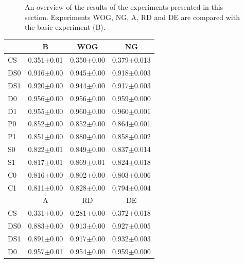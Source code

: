 \begin{figure}
\caption{An overview of the results of the experiments presented in this section. Experiments WOG, NG, A, RD and DE are compared with the basic experiment (B).}
\label{f:par:int}
\end{figure}

\begin{table}
\centering
\begin{tabular}{lccc}
\lsptoprule
         &B             &WOG           &NG\\\midrule
CS       &0.351$\pm$0.01&0.350$\pm$0.00&0.379$\pm$0.013\\%
DS0      &0.916$\pm$0.00&0.945$\pm$0.00&0.918$\pm$0.003\\%
DS1      &0.920$\pm$0.00&0.944$\pm$0.00&0.917$\pm$0.003\\%
D0       &0.956$\pm$0.00&0.956$\pm$0.00&0.959$\pm$0.000\\%
D1       &0.955$\pm$0.00&0.960$\pm$0.00&0.960$\pm$0.001\\%
P0       &0.852$\pm$0.00&0.852$\pm$0.00&0.864$\pm$0.001\\%
P1       &0.851$\pm$0.00&0.880$\pm$0.00&0.858$\pm$0.002\\%
S0       &0.822$\pm$0.01&0.849$\pm$0.00&0.837$\pm$0.014\\%
S1       &0.817$\pm$0.01&0.869$\pm$0.01&0.824$\pm$0.018\\%
C0       &0.816$\pm$0.00&0.802$\pm$0.00&0.803$\pm$0.006\\%
C1       &0.811$\pm$0.00&0.828$\pm$0.00&0.794$\pm$0.004\\%
\midrule
         &A             &RD            &DE\\\midrule
CS       &0.331$\pm$0.00&0.281$\pm$0.00&0.372$\pm$0.018\\%
DS0      &0.883$\pm$0.00&0.913$\pm$0.00&0.927$\pm$0.005\\%
DS1      &0.891$\pm$0.00&0.917$\pm$0.00&0.932$\pm$0.003\\%
D0       &0.957$\pm$0.01&0.954$\pm$0.00&0.959$\pm$0.000\\%

\end{tabular}
\end{table}
